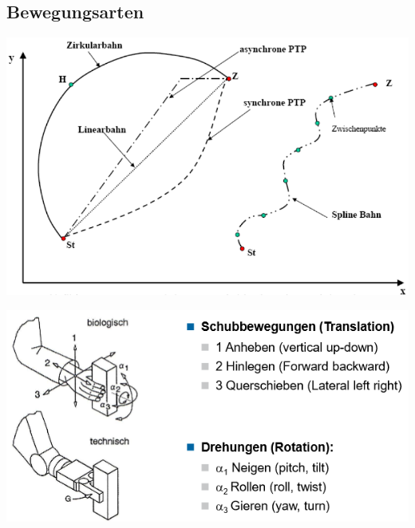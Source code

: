 \subsection{Bewegungsarten}
\begin{minipage}{0.5\linewidth}
\includegraphics[width=\linewidth]{./bilder/bewegungsarten.png}
\end{minipage}
\begin{minipage}{0.5\linewidth}
\includegraphics[width=\linewidth]{./bilder/Bewegunggreifer.png}
\end{minipage}
